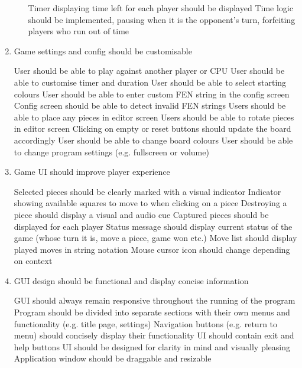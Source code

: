 \documentclass[../main/main.tex]{subfiles}
\begin{document}
\begin{enumerate}
\begin{enumerate}
    \objitem Timer displaying time left for each player should be displayed
    \objitem Time logic should be implemented, pausing when it is the opponent’s turn, forfeiting players who run out of time
    \end{enumerate}
\item Game settings and config should be customisable
    \begin{enumerate}
    \objitem User should be able to play against another player or CPU
    \objitem User should be able to customise timer and duration
    \objitem User should be able to select starting colours
    \objitem User should be able to enter custom FEN string in the config screen
    \objitem Config screen should be able to detect invalid FEN strings
    \objitem Users should be able to place any pieces in editor screen
    \objitem Users should be able to rotate pieces in editor screen
    \objitem Clicking on empty or reset buttons should update the board accordingly
    \objitem User should be able to change board colours
    \objitem User should be able to change program settings (e.g. fullscreen or volume)
    \end{enumerate}
\item Game UI should improve player experience
    \begin{enumerate}
    \objitem Selected pieces should be clearly marked with a visual indicator
    \objitem Indicator showing available squares to move to when clicking on a piece
    \objitem Destroying a piece should display a visual and audio cue
    \objitem Captured pieces should be displayed for each player
    \objitem Status message should display current status of the game (whose turn it is, move a piece, game won etc.)
    \objitem Move list should display played moves in string notation
    \objitem Mouse cursor icon should change depending on context
    \end{enumerate}
\item GUI design should be functional and display concise information
    \begin{enumerate}
    \objitem \label{itm:responsive-objective} GUI should always remain responsive throughout the running of the program
    \objitem Program should be divided into separate sections with their own menus and functionality (e.g. title page, settings)
    \objitem Navigation buttons (e.g. return to menu) should concisely display their functionality
    \objitem UI should contain exit and help buttons
    \objitem UI should be designed for clarity in mind and visually pleasing
    \objitem Application window should be draggable and resizable
    \end{enumerate}
\end{enumerate}
\end{document}
